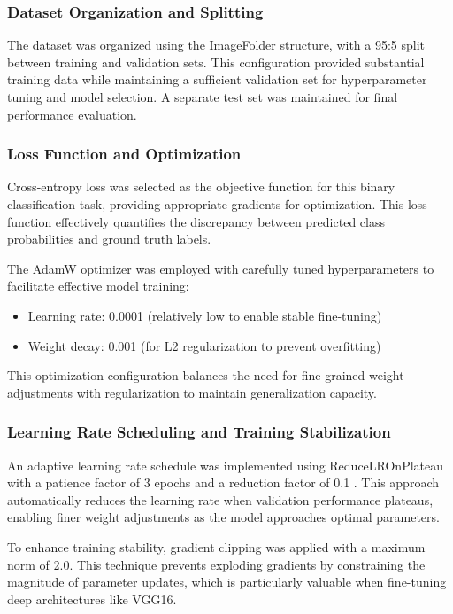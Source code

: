 \documentclass[a4paper,12pt]{article}
\begin{document}
\subsubsection{Dataset Organization and Splitting}

The dataset was organized using the ImageFolder structure, with a 95:5 split between training and validation sets. This configuration provided substantial training data while maintaining a sufficient validation set for hyperparameter tuning and model selection. A separate test set was maintained for final performance evaluation.

\subsubsection{Loss Function and Optimization}

Cross-entropy loss was selected as the objective function for this binary classification task, providing appropriate gradients for optimization. This loss function effectively quantifies the discrepancy between predicted class probabilities and ground truth labels.

The AdamW optimizer \citep{loshchilov2017decoupled} was employed with carefully tuned hyperparameters to facilitate effective model training:
\begin{itemize}
    \item Learning rate: 0.0001 (relatively low to enable stable fine-tuning)
    \item Weight decay: 0.001 (for L2 regularization to prevent overfitting)
\end{itemize}

This optimization configuration balances the need for fine-grained weight adjustments with regularization to maintain generalization capacity.

\subsubsection{Learning Rate Scheduling and Training Stabilization}

An adaptive learning rate schedule was implemented using ReduceLROnPlateau with a patience factor of 3 epochs and a reduction factor of 0.1 \citep{wu2015onreducelr}. This approach automatically reduces the learning rate when validation performance plateaus, enabling finer weight adjustments as the model approaches optimal parameters.

To enhance training stability, gradient clipping was applied with a maximum norm of 2.0. This technique prevents exploding gradients by constraining the magnitude of parameter updates, which is particularly valuable when fine-tuning deep architectures like VGG16.
\end{document}
